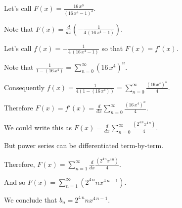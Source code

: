 \documentclass{ximera}
\begin{document}
\begin{question}
  \begin{solution}
    \begin{hint}
      Let's call \(F(x) = \displaystyle\frac{16 \, x^{3}}{{\left(16 \, x^{4} - 1\right)}^{2}}\).
    \end{hint}
    \begin{hint}
      Note that \(F(x) = \displaystyle\frac{d}{dx} \left( -\displaystyle\frac{1}{4 \, {\left(16 \, x^{4} - 1\right)}} \right)\).
    \end{hint}
    \begin{hint}
      Let's call \(f(x) = -\displaystyle\frac{1}{4 \, {\left(16 \, x^{4} - 1\right)}}\) so that \(F(x) = f'(x)\).
    \end{hint}
    \begin{hint}
      Note that \(\displaystyle\frac{1}{1 - \left(16 \, x^{4}\right)} = \displaystyle\sum_{n=0}^\infty \left( 16 \, x^{4} \right)^n \).
    \end{hint}
    \begin{hint}
      Consequently \(f(x) = \displaystyle\frac{1}{4 \left( 1 - \left(16 \, x^{4}\right)\right)} = \displaystyle\sum_{n=0}^\infty \displaystyle\frac{\left( 16 \, x^{4} \right)^n}{4} \).
    \end{hint}
    \begin{hint}
      Therefore \(F(x) = f'(x) = \displaystyle\frac{d}{dx} \displaystyle\sum_{n=0}^\infty \displaystyle\frac{\left( 16 \, x^{4} \right)^n}{4} \).
    \end{hint}
    \begin{hint}
      We could write this as \(F(x) = \displaystyle\frac{d}{dx} \displaystyle\sum_{n=0}^\infty \displaystyle\frac{\left( 2^{4 \, n} x^{4 \, n} \right)}{4} \).
    \end{hint}
    \begin{hint}
      But power series can be differentiated term-by-term.
    \end{hint}
    \begin{hint}
      Therefore, \(F(x) = \displaystyle\sum_{n=1}^\infty \displaystyle\frac{d}{dx} \displaystyle\frac{\left( 2^{4 \, n} x^{4 \, n} \right)}{4} \).
    \end{hint}
    \begin{hint}
      And so \(F(x) = \displaystyle\sum_{n=1}^\infty \left( 2^{4 \, n} n x^{4 \, n - 1} \right) \).
    \end{hint}
    \begin{hint}
      We conclude that \(b_n = 2^{4 \, n} n x^{4 \, n - 1} \).
    \end{hint}


    \begin{multiple-choice}
    \end{multiple-choice}

  \end{solution}
\end{question}
\end{document}
